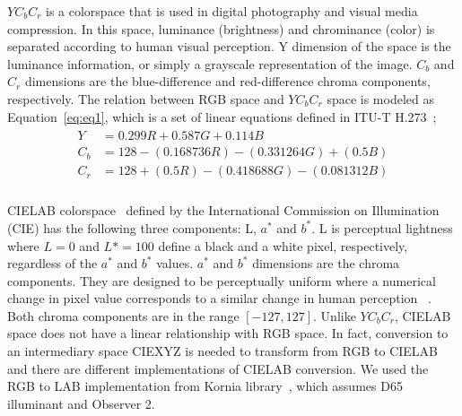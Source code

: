 \(YC_{b}C_{r}\) is a colorspace that is used in digital photography and visual media compression. In this space, luminance (brightness) and chrominance (color) is separated according to human visual perception. Y dimension of the space is the luminance information, or simply a grayscale representation of the image. \(C_b\) and \(C_r\) dimensions are the blue-difference and red-difference chroma components, respectively. The relation between RGB space and \(YC_{b}C_{r}\) space is modeled as Equation~\ref*{eq:eq1}, which is a set of linear equations defined in ITU-T H.273~\cite{hamilton2004jpeg};
\begin{align}
    \label{eq:eq1}
    \begin{split}
        Y   & = 0.299 R+0.587 G+0.114 B                   \\
        C_b & = 128-(0.168736 R)-(0.331264 G)+(0.5 B)     \\
        C_r & = 128+(0.5 R)-(0.418688 G)-(0.081312 B)     \\
    \end{split}
\end{align}


CIELAB colorspace~\cite{schanda2007colorimetry} defined by the International Commission on Illumination (CIE) has the following three components: L, \(a^*\) and \(b^*\). L is perceptual lightness where \(L = 0\) and \(L* = 100\) define a black and a white pixel, respectively, regardless of the \(a^*\) and \(b^*\) values. \(a^*\) and \(b^*\) dimensions are the chroma components. They are designed to be perceptually uniform where a numerical change in pixel value corresponds to a similar change in human perception ~\cite{mahy1992luminancevschroma}. Both chroma components are in the range \([-127, 127]\). Unlike \(YC_{b}C_{r}\), CIELAB space does not have a linear relationship with RGB space. In fact, conversion to an intermediary space CIEXYZ is needed to transform from RGB to CIELAB and there are different implementations of CIELAB conversion. We used the RGB to LAB implementation from Kornia library~\cite{riba2020kornia}, which assumes D65 illuminant and Observer 2.



